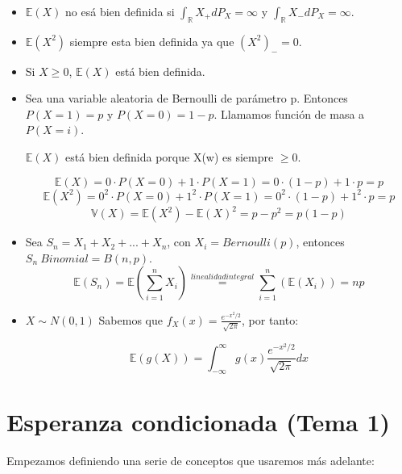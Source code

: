 \documentclass{apuntes}
\begin{document}
\begin{example}
\begin{itemize}
\item $\mathbb{E}(X)$ no esá bien definida si $\int_{\mathbb{R}}X_+ dP_X=\infty$ y $\int_{\mathbb{R}}X_- dP_X=\infty$.

\item $\mathbb{E}(X^2)$ siempre esta bien definida ya que $(X^2)_-=0$.
\item Si $X \geq 0$, $\mathbb{E}(X)$ está bien definida.
\item Sea una variable aleatoria de Bernoulli de parámetro p. Entonces $P(X=1)=p$ y $P(X=0)=1-p$. Llamamos función de masa a $P(X=i)$.

$\mathbb{E}(X)$ está bien definida porque X(w) es siempre $\geq 0$. 

\[
\mathbb{E}(X)=0\cdot P(X=0)+1\cdot P(X=1)=0\cdot(1-p)+1\cdot p=p
\]
\[
\mathbb{E}(X^2)=0^2\cdot P(X=0)+1^2\cdot P(X=1)=0^2\cdot(1-p)+1^2\cdot p=p
\]
\[
\mathbb{V}(X)=\mathbb{E}(X^2)-\mathbb{E}(X)^2=p-p^2=p(1-p)
\]
\item Sea $S_n=X_1+X_2+...+X_n$, con $X_i=Bernoulli(p)$, entonces $S_n ~ Binomial=B(n,p)$.
\[
\mathbb{E}(S_n)=\mathbb{E}(\sum_{i=1}^{n}X_i)\stackrel{linealidad integral}{=}\sum_{i=1}^{n}(\mathbb{E}(X_i))=np
\]
\item $X\sim N(0,1)$
Sabemos que $f_X(x)=\frac{e^{-x^2/2}}{\sqrt{2\pi}}$, por tanto:

\[
\mathbb{E}(g(X))=\int_{-\infty}^{\infty}g(x)\frac{e^{-x^2/2}}{\sqrt{2\pi}}dx
\]
\end{itemize}
\end{example}

\chapter{Esperanza condicionada (Tema 1)}

Empezamos definiendo una serie de conceptos que usaremos más adelante:
\end{document}
